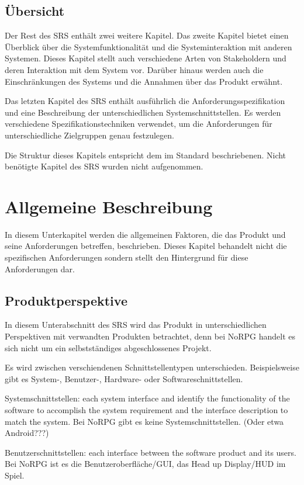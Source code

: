 	\subsection{Übersicht}
		Der Rest des SRS enthält zwei weitere Kapitel. Das zweite Kapitel bietet einen Überblick über die Systemfunktionalität und die Systeminteraktion mit anderen Systemen. Dieses Kapitel stellt auch verschiedene Arten von Stakeholdern und deren Interaktion mit dem System vor. Darüber hinaus werden auch die Einschränkungen des Systems und die Annahmen über das Produkt erwähnt.
	
		Das letzten Kapitel des SRS enthält ausführlich die Anforderungsspezifikation und eine Beschreibung der unterschiedlichen Systemschnittstellen. Es werden verschiedene Spezifikationstechniken verwendet, um die Anforderungen für unterschiedliche Zielgruppen genau festzulegen.
	
		Die Struktur dieses Kapitels entspricht dem im Standard beschriebenen. Nicht benötigte Kapitel des SRS wurden nicht aufgenommen.
		
\section{Allgemeine Beschreibung}
	In diesem Unterkapitel werden die allgemeinen Faktoren, die das Produkt und seine Anforderungen betreffen, beschrieben. Dieses Kapitel behandelt nicht die spezifischen Anforderungen sondern stellt den Hintergrund für diese Anforderungen dar. 

	\subsection{Produktperspektive}
		In diesem Unterabschnitt des SRS wird das Produkt in unterschiedlichen Perspektiven mit verwandten Produkten betrachtet, denn bei NoRPG handelt es sich nicht um ein selbstständiges abgeschlossenes Projekt.
		
		Es wird zwischen verschiendenen Schnittstellentypen unterschieden. Beispielsweise gibt es System-, Benutzer-, Hardware- oder Softwareschnittstellen. 
		
		Systemschnittstellen: each system interface and identify the functionality of the software to accomplish the system
requirement and the interface description to match the system. Bei NoRPG gibt es keine Systemschnittstellen. (Oder etwa Android???)

		Benutzerschnittstellen: each interface between the software product and its users. Bei NoRPG ist es die Benutzeroberfläche/GUI, das Head up Display/HUD im Spiel.
		
